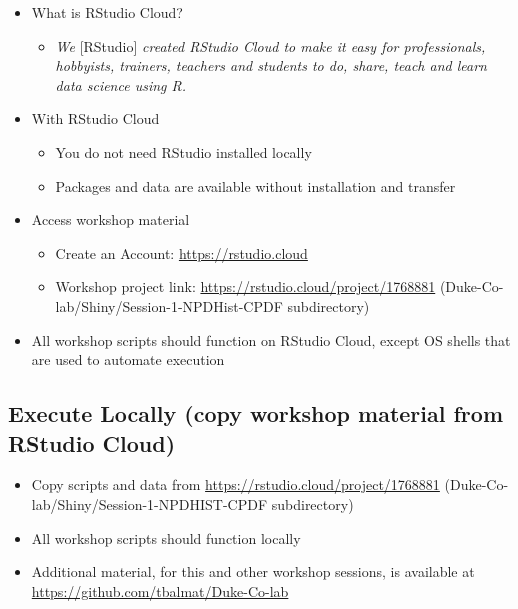 \documentclass[10pt, letterpaper]{article}
\begin{document}
\begin{spacing}{1.0}
\begin{itemize}
    \item What is RStudio Cloud?
    \begin{itemize}
        \item \textit{We} {[RStudio]} \textit{created RStudio Cloud to make it easy for professionals, hobbyists, trainers, teachers and students to do, share, teach and learn data science using R.}
    \end{itemize}
    \item With RStudio Cloud
    \begin{itemize}
        \item You do not need RStudio installed locally
        \item Packages and data are available without installation and transfer
    \end{itemize}
    \item Access workshop material
    \begin{itemize}
        \item Create an Account:  \url{https://rstudio.cloud}
        \item Workshop project link:  \url{https://rstudio.cloud/project/1768881} (Duke-Co-lab/Shiny/Session-1-NPDHist-CPDF subdirectory)
    \end{itemize}
    \item All workshop scripts should function on RStudio Cloud, except OS shells that are used to automate execution
\end{itemize}

\subsection{Execute Locally (copy workshop material from RStudio Cloud)}\label{sec:materialgit}

\begin{itemize}
    \item Copy scripts and data from \url{https://rstudio.cloud/project/1768881} (Duke-Co-lab/Shiny/Session-1-NPDHIST-CPDF subdirectory)
    \item All workshop scripts should function locally
    \item Additional material, for this and other workshop sessions, is available at \url{https://github.com/tbalmat/Duke-Co-lab}
\end{itemize}



\end{spacing}
\end{document}
